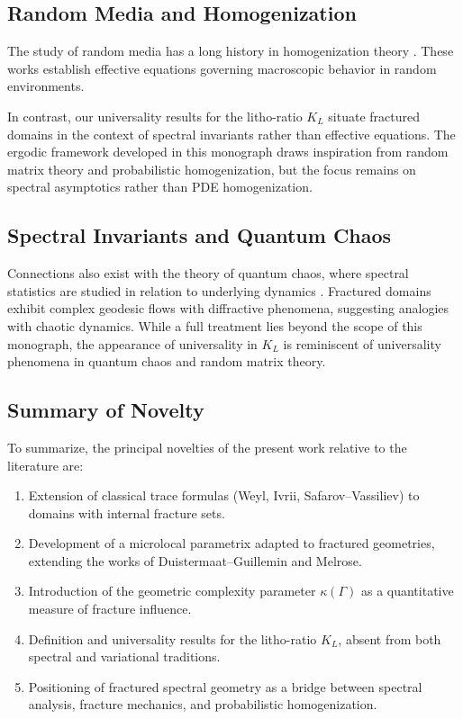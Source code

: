 \subsection{Random Media and Homogenization}

The study of random media has a long history in homogenization theory
\cite{PapanicolaouVaradhan1981, Kozlov1979, Jikov1994}. These works establish
effective equations governing macroscopic behavior in random environments.

In contrast, our universality results for the litho-ratio $K_L$ situate
fractured domains in the context of spectral invariants rather than effective
equations. The ergodic framework developed in this monograph draws inspiration
from random matrix theory and probabilistic homogenization, but the focus
remains on spectral asymptotics rather than PDE homogenization.

\subsection{Spectral Invariants and Quantum Chaos}

Connections also exist with the theory of quantum chaos, where spectral
statistics are studied in relation to underlying dynamics
\cite{Gutzwiller1990, Zelditch2017}. Fractured domains exhibit complex
geodesic flows with diffractive phenomena, suggesting analogies with chaotic
dynamics. While a full treatment lies beyond the scope of this monograph, the
appearance of universality in $K_L$ is reminiscent of universality phenomena in
quantum chaos and random matrix theory.

\subsection{Summary of Novelty}

To summarize, the principal novelties of the present work relative to the
literature are:

\begin{enumerate}
  \item Extension of classical trace formulas (Weyl, Ivrii, Safarov--Vassiliev)
  to domains with internal fracture sets.
  \item Development of a microlocal parametrix adapted to fractured geometries,
  extending the works of Duistermaat--Guillemin and Melrose.
  \item Introduction of the geometric complexity parameter $\kappa(\Gamma)$ as a
  quantitative measure of fracture influence.
  \item Definition and universality results for the litho-ratio $K_L$, absent
  from both spectral and variational traditions.
  \item Positioning of fractured spectral geometry as a bridge between spectral
  analysis, fracture mechanics, and probabilistic homogenization.
\end{enumerate}

